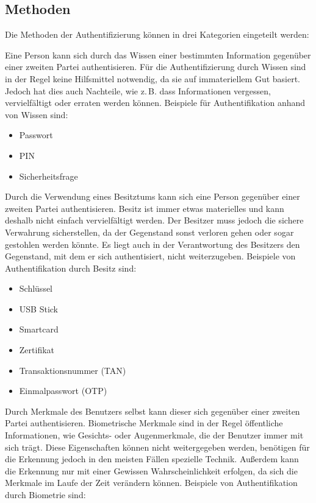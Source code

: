 \documentclass[11pt,a4paper,ngerman]{scrreprt}
\begin{document}
\subsection{Methoden}
Die Methoden der Authentifizierung können in drei Kategorien eingeteilt werden:
\begin{description}[font=\rmfamily]
    \item[Wissen:] Eine Person kann sich durch das Wissen einer bestimmten Information gegenüber einer zweiten Partei authentisieren. Für die Authentifizierung durch Wissen sind in der Regel keine Hilfsmittel notwendig, da sie auf immateriellem Gut basiert. Jedoch hat dies auch Nachteile, wie z.\,B. dass Informationen vergessen, vervielfältigt oder erraten werden können. Beispiele für Authentifikation anhand von Wissen sind:
    \begin{itemize}
    \item Passwort
    \item PIN
    \item Sicherheitsfrage
    \end{itemize} 
    \item[Besitz:] Durch die Verwendung eines Besitztums kann sich eine Person gegenüber einer zweiten Partei authentisieren. Besitz ist immer etwas materielles und kann deshalb nicht einfach vervielfältigt werden. Der Besitzer muss jedoch die sichere Verwahrung sicherstellen, da der Gegenstand sonst verloren gehen oder sogar gestohlen werden könnte. Es liegt auch in der Verantwortung des Besitzers den Gegenstand, mit dem er sich authentisiert, nicht weiterzugeben. Beispiele von Authentifikation durch Besitz sind:
    \begin{itemize}
        \item Schlüssel
        \item USB Stick
        \item Smartcard
        \item Zertifikat
        \item Transaktionsnummer (TAN)
        \item Einmalpasswort (OTP)
    \end{itemize}
    \item[Körperliches Merkmal / Biometrie:] Durch Merkmale des Benutzers selbst kann dieser sich gegenüber einer zweiten Partei authentisieren. Biometrische Merkmale sind in der Regel öffentliche Informationen, wie Gesichts- oder Augenmerkmale, die der Benutzer immer mit sich trägt. Diese Eigenschaften können nicht weitergegeben werden, benötigen für die Erkennung jedoch in den meisten Fällen spezielle Technik. Außerdem kann die Erkennung nur mit einer Gewissen Wahrscheinlichkeit erfolgen, da sich die Merkmale im Laufe der Zeit verändern können. Beispiele von Authentifikation durch Biometrie sind:

\end{description}
\end{document}
